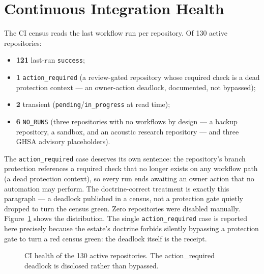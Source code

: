 
\section{Continuous Integration Health}
\label{sec:ci}

The CI census reads the last workflow run per repository. Of 130 active repositories:
\begin{itemize}
\item \textbf{121} last-run \texttt{success};
\item \textbf{1} \texttt{action\_required} (a review-gated repository whose required check is a dead protection context --- an owner-action deadlock, documented, not bypassed);
\item \textbf{2} transient (\texttt{pending}/\texttt{in\_progress} at read time);
\item \textbf{6} \texttt{NO\_RUNS} (three repositories with no workflows by design --- a backup repository, a sandbox, and an acoustic research repository --- and three GHSA advisory placeholders).
\end{itemize}
The \texttt{action\_required} case deserves its own sentence: the repository's branch protection references a required check that no longer exists on any workflow path (a dead protection context), so every run ends awaiting an owner action that no automation may perform. The doctrine-correct treatment is exactly this paragraph --- a deadlock published in a census, not a protection gate quietly dropped to turn the census green. Zero repositories were disabled manually. Figure~\ref{fig:ci} shows the distribution. The single \texttt{action\_required} case is reported here precisely because the estate's doctrine forbids silently bypassing a protection gate to turn a red census green: the deadlock itself is the receipt.

\begin{figure}[htbp]
\centering
{}
\caption{CI health of the 130 active repositories. The action\_required deadlock is disclosed rather than bypassed.}
\label{fig:ci}
\end{figure}

